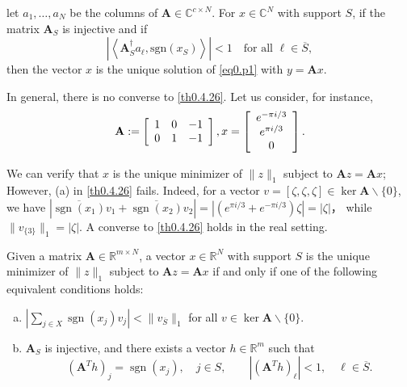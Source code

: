 \begin{corollary}
    \label{clr0.4.28}
    let $a_1,\dots,a_N$ be the columns of $\mathbf{A} \in \mathbb{C}^{c \times N}$. For $x \in \mathbb{C}^N$ with support $S$, if the matrix $\mathbf{A}_S$ is injective and if 
    \begin{equation}
        \left|\left<\mathbf{A}_S^{\dagger}a_{\ell}, \text{sgn}(x_S)\right>\right| < 1 \quad \text{for all } \ell \in \overline{S},
        \label{eq0.4.24}
    \end{equation}
    then the vector $x$ is the unique solution of \cref{eq0.p1} with $y = \mathbf{A}x$.
\end{corollary}

\begin{remark}
    \label{rmk0.4.29}
    In general, there is no converse to \cref{th0.4.26}. Let us consider, for instance,
    \[
        \mathbf{A} := \left[ 
            \begin{array}[]{ccc}
                1 & 0 & -1 \\
                0 & 1 & -1
            \end{array}
        \right],
        x = \left[ 
            \begin{array}[]{c}
                e^{-\pi i/3} \\
                e^{\pi i/3} \\
                0
            \end{array}
        \right].
    \]
\end{remark}
We can verify that $x$ is the unique minimizer of $\|z\|_1$ subject to $\mathbf{A}z = \mathbf{A}x$; However, (a) in \cref{th0.4.26} fails. Indeed, for a vector $v = [\zeta,\zeta,\zeta] \in \mathop{\mathrm{ker}}\mathbf{A} \backslash \{0\}$, we have $|\overline{\mathop{\mathrm{sgn}}(x_1)}v_1 + \overline{\mathop{\mathrm{sgn}}(x_2)}v_2| = |(e^{\pi i/3} + e^{-\pi i/3})\zeta| = |\zeta|$， while $\|v_{\{3\}}\|_1 = |\zeta|$. A converse to \cref{th0.4.26} holds in the real setting.

\begin{theorem}
    \label{th0.4.30}
    Given a matrix $\mathbf{A} \in \mathbb{R}^{m \times N}$, a vector $x \in \mathbb{R}^N$ with support $S$ is the  unique minimizer of $\|z\|_1$ subject to $\mathbf{A}z = \mathbf{A}x$ if and only if one of the following equivalent conditions holds:
    \begin{enumerate}[(a)]
        \item $\left|\sum\limits_{j \in X}^{} \mathop{\mathrm{sgn}}(x_j)v_j\right| < \|v_{\overline{S}}\|_1$ for all $v \in \mathop{\mathrm{ker}} \mathbf{A} \backslash \{0\}$.
        \item $\mathbf{A}_S$ is injective, and there exists a vector $h \in \mathbb{R}^m$ such that 
            \[
                (\mathbf{A}^T h)_j = \mathop{\mathrm{sgn}}(x_j), \quad j \in S, \qquad \left|(\mathbf{A}^T h)_{\ell}\right| < 1, \quad \ell \in \overline{S}.
            \]
    \end{enumerate}
\end{theorem}

